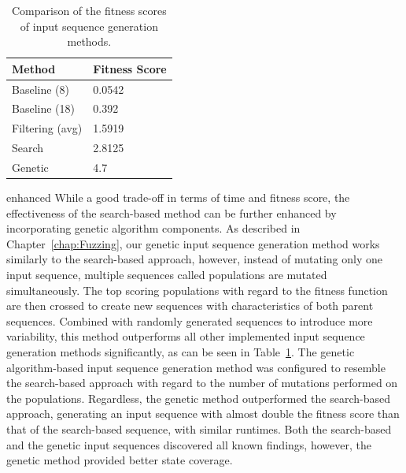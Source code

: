 \begin{table}[b]
	\centering
	\begin{tabular}{|l|l|}
		\hline
		\rowcolor[HTML]{EFEFEF} 
		\textbf{Method} & \textbf{Fitness Score}  \\ \hline
		Baseline (8)              	&  0.0542     \\ \hline
		Baseline (18)              	&  0.392      \\ \hline
		Filtering (avg)             &  1.5919     \\ \hline
		Search              		&  2.8125     \\ \hline
		Genetic              		&  4.7        \\ \hline
	\end{tabular}
	\caption{Comparison of the fitness scores of input sequence generation methods.}
	\label{tab:compbasesearch}
\end{table}
enhanced
While a good trade-off in terms of time and fitness score, the effectiveness of the search-based method can be further enhanced by incorporating genetic algorithm components. As described in Chapter~\ref{chap:Fuzzing}, our genetic input sequence generation method works similarly to the search-based approach, however, instead of mutating only one input sequence, multiple sequences called populations are mutated simultaneously. The top scoring populations with regard to the fitness function are then crossed to create new sequences with characteristics of both parent sequences. Combined with randomly generated sequences to introduce more variability, this method outperforms all other implemented input sequence generation methods significantly, as can be seen in Table~\ref{tab:compbasesearch}. The genetic algorithm-based input sequence generation method was configured to resemble the search-based approach with regard to the number of mutations performed on the populations. Regardless, the genetic method outperformed the search-based approach, generating an input sequence with almost double the fitness score than that of the search-based sequence, with similar runtimes. Both the search-based and the genetic input sequences discovered all known findings, however, the genetic method provided better state coverage.

